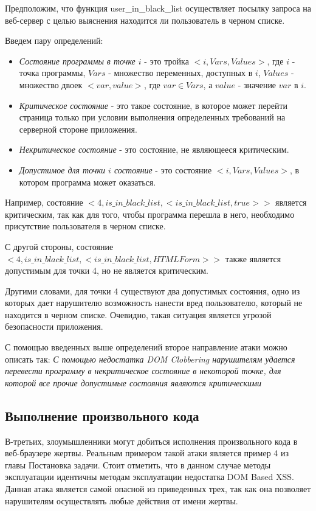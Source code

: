 Предположим, что функция user\_in\_black\_list осуществляет посылку запроса на веб-сервер с целью выяснения находится ли пользователь в черном списке.


Введем пару определений:
\begin{itemize}
	\item \textit{Состояние программы в точке $i$} - это тройка $<i, Vars, Values>$, где $i$ - точка программы, $Vars$ - множество переменных, доступных в $i$, $Values$ - множество двоек $<var, value>$, где $var \in Vars$, а $value$ - значение $var$ в $i$.  
	\item \textit{Критическое состояние} - это такое состояние, в которое может перейти страница только при условии выполнения определенных требований на серверной стороне приложения.
	\item \textit{Некритическое состояние} - это состояние, не являющееся критическим.
	\item \textit{Допустимое для точки $i$ состояние} - это состояние $<i, Vars, Values>$, в котором программа может оказаться.
\end{itemize}


Например, состояние $<4, is\_in\_black\_list , <is\_in\_black\_list, true>>$ является критическим, так как для того, чтобы программа перешла в него, необходимо присутствие пользователя в черном списке.

\bigskip
С другой стороны, состояние $<4, is\_in\_black\_list, <is\_in\_black\_list, HTMLForm>>$  также является допустимым для точки 4, но не является критическим.
\bigskip

Другими словами, для точки 4 существуют два допустимых состояния, одно из которых дает нарушителю возможность нанести вред пользователю, который не находится в черном списке. Очевидно, такая ситуация является угрозой безопасности приложения.


С помощью введенных выше определений второе направление атаки можно описать так: \textit{С помощью недостатка DOM Clobbering нарушителям удается перевести программу в некритическое состояние в некоторой точке, для которой все прочие допустимые состояния являются критическими}

\subsection{Выполнение произвольного кода}
В-третьих, злоумышленники могут добиться исполнения произвольного кода в веб-браузере жертвы. Реальным примером такой атаки является пример 4 из главы Постановка задачи. Стоит отметить, что в данном случае методы эксплуатации идентичны методам эксплуатации недостатка DOM Based XSS. Данная атака является самой опасной из приведенных трех, так как она позволяет нарушителям осуществлять любые действия от имени жертвы.

